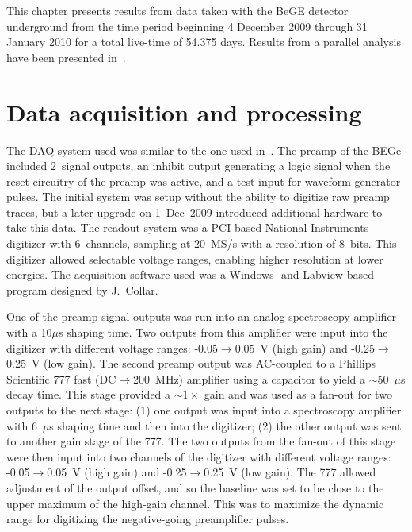 This chapter presents results from data taken with the BeGE detector underground from the time period beginning 4 December 2009 through 31 January 2010 for a total live-time of 54.375 days.  Results from a parallel analysis have been presented in~\cite{Aalseth:2010aa}.

	\section{Data acquisition and processing}
	\label{sec:BeGeDAQProcessing}
	
The DAQ system used was similar to the one used in~\cite{Aalseth:2008aa}.  The preamp of the BEGe included 2~signal outputs, an inhibit output generating a logic signal when the reset circuitry of the preamp was active, and a test input for waveform generator pulses.  The initial system was setup without the ability to digitize raw preamp traces, but a later upgrade on 1~Dec~2009 introduced additional hardware to take this data.  The readout system was a PCI-based National Instruments digitizer with 6~channels, sampling at 20~MS/s with a resolution of 8~bits.  This digitizer allowed selectable voltage ranges, enabling higher resolution at lower energies.  The acquisition software used was a Windows- and Labview-based program designed by J.~Collar.  

One of the preamp signal outputs was run into an analog spectroscopy amplifier with a 10$\mu$s shaping time.  Two outputs from this amplifier were input into the digitizer with different voltage ranges: -0.05$\to$0.05~V (high gain) and -0.25$\to$0.25~V (low gain).  The second preamp output was AC-coupled to a Phillips Scientific 777 fast (DC$\to$200~MHz) amplifier using a capacitor to yield a $\sim$50~$\mu$s decay time.  This stage provided a $\sim1\times$ gain and was used as a fan-out for two outputs to the next stage: (1) one output was input into a spectroscopy amplifier with 6~$\mu$s shaping time and then into the digitizer; (2) the other output was sent to another gain stage of the 777.  The two outputs from the fan-out of this stage were then input into two channels of the digitizer with different voltage ranges: -0.05$\to$0.05~V (high gain) and -0.25$\to$0.25~V (low gain).  The 777 allowed adjustment of the output offset, and so the baseline was set to be close to the upper maximum of the high-gain channel.  This was to maximize the dynamic range for digitizing the negative-going preamplifier pulses.  

